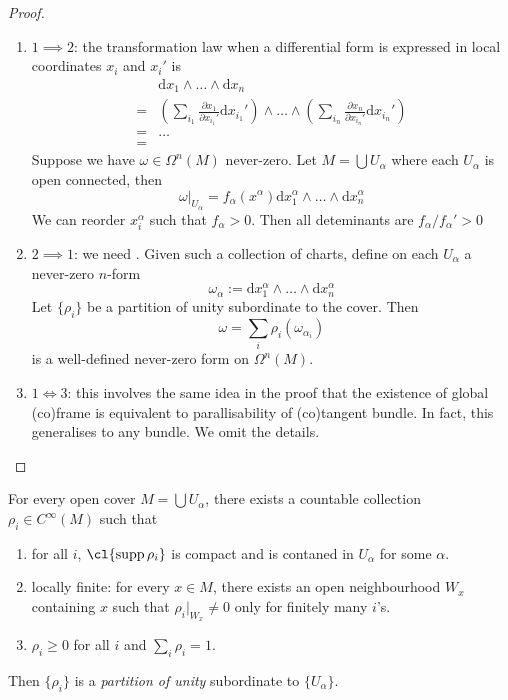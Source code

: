 \documentclass[a4paper]{article}
\DeclareMathOperator{\supp}{supp} %
\newcommand{\w}{\wedge}
\begin{document}
\begin{proof}\leavevmode
  \begin{enumerate}
  \item \(1 \implies 2\): the transformation law when a differential form is expressed in local coordinates \(x_i\) and \(x_i'\) is
    \begin{align*}
      &\mathrm dx_1 \w \dots \w \mathrm dx_n \\
      =& \left( \sum_{i_1} \frac{\partial x_1}{\partial x_{i_1}'} \mathrm dx_{i_1}' \right) \w \dots \w \left( \sum_{i_n} \frac{\partial x_n}{\partial x_{i_n}'} \mathrm dx_{i_n}' \right) \\
      =& \dots \\
      =& 
    \end{align*}
    Suppose we have \(\omega \in \Omega^n(M)\) never-zero. Let \(M = \bigcup U_\alpha\) where each \(U_\alpha\) is open connected, then
    \[
      \omega|_{U_\alpha} = f_\alpha(x^\alpha) \mathrm d x_1^\alpha \w \dots \w \mathrm dx_n^\alpha
    \]
    We can reorder \(x_i^\alpha\) such that \(f_\alpha > 0\). Then all deteminants are \(f_\alpha/f_\alpha' > 0\)
  \item \(2 \implies 1\): we need . Given such a collection of charts, define on each \(U_\alpha\) a never-zero \(n\)-form
    \[
      \omega_\alpha := \mathrm d x_1^\alpha \w \dots \w \mathrm dx_n^\alpha
    \]
    Let \(\{\rho_i\}\) be a partition of unity subordinate to the cover. Then
    \[
      \omega = \sum_i \rho_i (\omega_{\alpha_i})
    \]
    is a well-defined never-zero form on \(\Omega^n(M)\).
  \item \(1 \Longleftrightarrow 3\): this involves the same idea in the proof that the existence of global (co)frame is equivalent to parallisability of (co)tangent bundle. In fact, this generalises to any bundle. We omit the details.
  \end{enumerate}
\end{proof}

\begin{theorem}
  \label{thm:partition of unity}
  For every open cover \(M = \bigcup U_\alpha\), there exists a countable collection \(\rho_i \in C^\infty(M)\) such that
  \begin{enumerate}
  \item for all \(i\), \(\cl{\supp{\rho_i}}\) is compact and is contaned in \(U_\alpha\) for some \(\alpha\).
  \item locally finite: for every \(x \in M\), there exists an open neighbourhood \(W_x\) containing \(x\) such that \(\rho_i|_{W_x} \neq 0\) only for finitely many \(i\)'s.
  \item \(\rho_i \geq 0\) for all \(i\) and \(\sum_i \rho_i = 1\).
  \end{enumerate}
  Then \(\{\rho_i\}\) is a \emph{partition of unity} subordinate to \(\{U_\alpha\}\).
\end{theorem}
\end{document}
